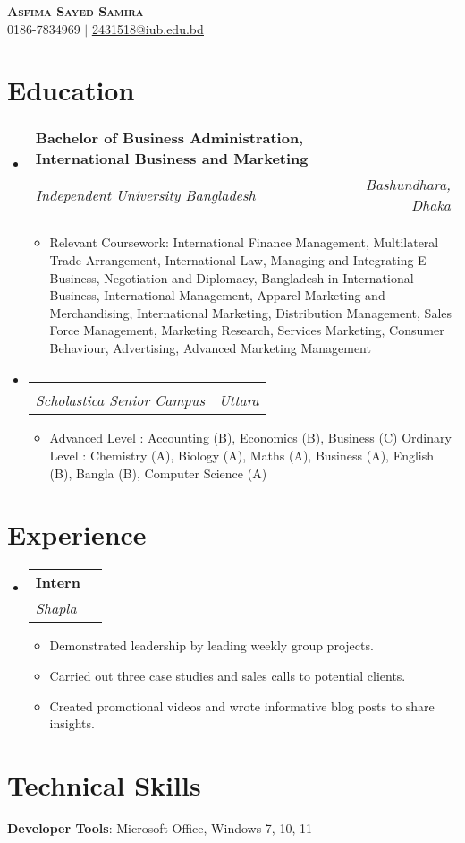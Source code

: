 \documentclass[letterpaper,11pt]{article}
\makeatletter
\newcommand{\resumeItem}[1]{
  \item\small{
    {#1 \vspace{-2pt}}
  }
}
\newcommand{\resumeSubheading}[4]{
  \vspace{-2pt}\item
    \begin{tabular*}{0.97\textwidth}[t]{l@{\extracolsep{\fill}}r}
      \textbf{#1} & #2 \\
      \textit{\small#3} & \textit{\small #4} \\
    \end{tabular*}\vspace{-7pt}
}
\newcommand{\resumeSubHeadingListStart}{\begin{itemize}[leftmargin=0.15in, label={}]}
\newcommand{\resumeSubHeadingListEnd}{\end{itemize}}
\newcommand{\resumeItemListStart}{\begin{itemize}}
\newcommand{\resumeItemListEnd}{\end{itemize}\vspace{-5pt}}
\makeatother
\begin{document}
\begin{center}
    \textbf{\Huge \scshape Asfima Sayed Samira} \\ \vspace{1pt}
    \small 0186-7834969 $|$ \href{mailto:2431518@iub.edu.bd}{\underline{2431518@iub.edu.bd}}
\end{center}

\section{Education}
  \resumeSubHeadingListStart
    \resumeSubheading
      {Bachelor of Business Administration, International Business and Marketing}{}
      {Independent University Bangladesh}{Bashundhara, Dhaka}
      \resumeItemListStart
        \resumeItem{Relevant Coursework: International Finance Management, Multilateral Trade Arrangement, International Law, Managing and Integrating E-Business, Negotiation and Diplomacy, Bangladesh in International Business, International Management, Apparel Marketing and Merchandising, International Marketing, Distribution Management, Sales Force Management, Marketing Research, Services Marketing, Consumer Behaviour, Advertising, Advanced Marketing Management}
      \resumeItemListEnd
    \resumeSubheading
      {}{}
      {Scholastica Senior Campus}{Uttara}
      \resumeItemListStart
        \resumeItem{Advanced Level : Accounting (B), Economics (B), Business (C)
Ordinary Level : Chemistry (A), Biology (A), Maths (A), Business (A), English (B), Bangla (B), Computer Science (A)}
      \resumeItemListEnd
  \resumeSubHeadingListEnd

\section{Experience}
  \resumeSubHeadingListStart
    \resumeSubheading
      {Intern}{}
      {Shapla}{}
      \resumeItemListStart
        \resumeItem{Demonstrated leadership by leading weekly group projects.}
        \resumeItem{Carried out three case studies and sales calls to potential clients.}
        \resumeItem{Created promotional videos and wrote informative blog posts to share insights.}
      \resumeItemListEnd
  \resumeSubHeadingListEnd

\section{Technical Skills}
 \begin{itemize}[leftmargin=0.15in, label={}]
    \small{\item{
     \textbf{Developer Tools}: Microsoft Office, Windows 7, 10, 11
    }}
 \end{itemize}
\end{document}
